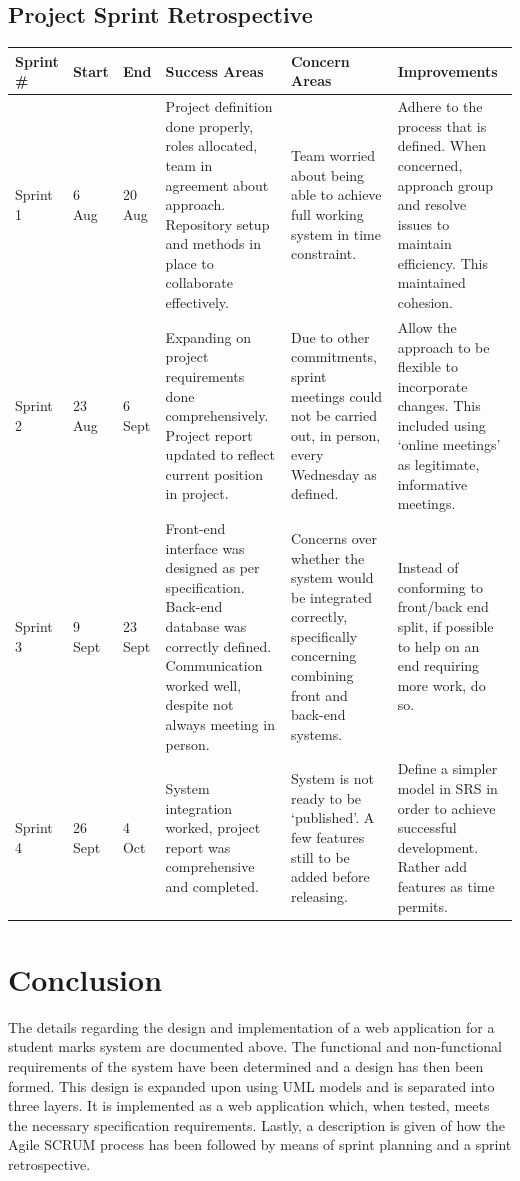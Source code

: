 \documentclass[paper=a4, fontsize=11pt]{scrartcl}
\numberwithin{equation}{section}		%
\numberwithin{figure}{section}			%
\numberwithin{table}{section}				%
\begin{document}
\subsection{Project Sprint Retrospective}
\begin{tabular}{|p{1cm}|p{1.2cm}|p{1.2cm}|p{3.7cm}|p{3.7cm}|p{3.7cm}|}
\hline \textbf{Sprint} \# & \textbf{Start} & \textbf{End} & \textbf{Success Areas} & \textbf{Concern Areas} & \textbf{Improvements}\\
\hline Sprint 1& 6 Aug & 20 Aug & Project definition done properly, roles allocated, team in agreement about approach. Repository setup and methods in place to collaborate effectively. & Team worried about being able to achieve full working system in time constraint. & Adhere to the process that is defined. When concerned, approach group and resolve issues to maintain efficiency. This maintained cohesion. \\

\hline Sprint 2 & 23 Aug & 6 Sept & Expanding on project requirements done comprehensively. Project report updated to reflect current position in project. & Due to other commitments, sprint meetings could not be carried out, in person, every Wednesday as defined. & Allow the approach to be flexible to incorporate changes. This included using ‘online meetings’ as legitimate, informative meetings.\\
\hline Sprint 3 & 9 Sept & 23 Sept & Front-end interface was designed as per specification.
Back-end database was correctly defined. Communication worked well, despite not always meeting in person. & Concerns over whether the system would be integrated correctly, specifically concerning combining front and back-end systems. & Instead of conforming to front/back end split, if possible to help on an end requiring more work, do so. \\
\hline Sprint 4 & 26 Sept & 4 Oct & System integration worked, project report was comprehensive and completed. & System is not ready to be ‘published’. A few features still to be added before releasing. & Define a simpler model in SRS in order to achieve successful development. Rather add features as time permits. \\
\hline
\end{tabular}


\section{Conclusion}
The details regarding the design and implementation of a web application for a student marks system are documented above. The functional and non-functional requirements of the system have been determined and a design has then been formed. This design is expanded upon using UML models and is separated into three layers. It is implemented as a web application which, when tested, meets the necessary specification requirements. Lastly, a description is given of how the Agile SCRUM process has been followed by means of sprint planning and a sprint retrospective.
\end{document}
